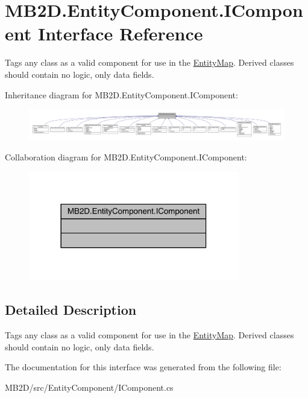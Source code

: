 \hypertarget{interface_m_b2_d_1_1_entity_component_1_1_i_component}{}\section{M\+B2\+D.\+Entity\+Component.\+I\+Component Interface Reference}
\label{interface_m_b2_d_1_1_entity_component_1_1_i_component}


Tags any class as a valid component for use in the \hyperlink{class_m_b2_d_1_1_entity_component_1_1_entity_map}{Entity\+Map}. Derived classes should contain no logic, only data fields.  




Inheritance diagram for M\+B2\+D.\+Entity\+Component.\+I\+Component\+:
\nopagebreak
\begin{figure}[H]
\begin{center}
\leavevmode
\includegraphics[width=350pt]{interface_m_b2_d_1_1_entity_component_1_1_i_component__inherit__graph}
\end{center}
\end{figure}


Collaboration diagram for M\+B2\+D.\+Entity\+Component.\+I\+Component\+:
\nopagebreak
\begin{figure}[H]
\begin{center}
\leavevmode
\includegraphics[width=261pt]{interface_m_b2_d_1_1_entity_component_1_1_i_component__coll__graph}
\end{center}
\end{figure}


\subsection{Detailed Description}
Tags any class as a valid component for use in the \hyperlink{class_m_b2_d_1_1_entity_component_1_1_entity_map}{Entity\+Map}. Derived classes should contain no logic, only data fields. 



The documentation for this interface was generated from the following file\+:\begin{DoxyCompactItemize}
\item 
M\+B2\+D/src/\+Entity\+Component/I\+Component.\+cs\end{DoxyCompactItemize}
